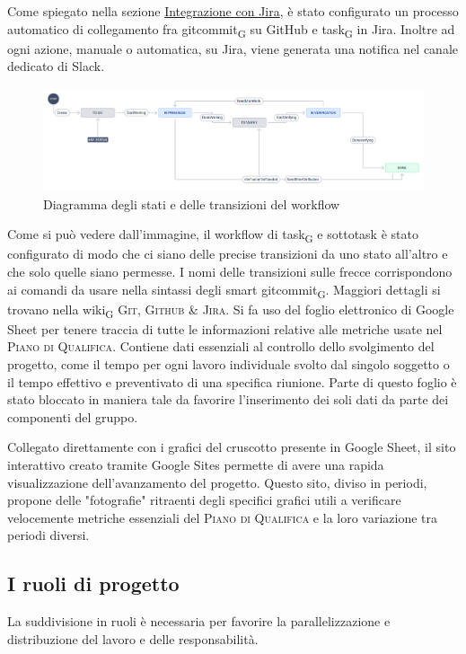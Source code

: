         Come spiegato nella sezione \hyperref[jiraintegration]{Integrazione con Jira}, è stato configurato un processo automatico di collegamento fra gitcommit\textsubscript{G} su GitHub e task\textsubscript{G} in Jira. Inoltre ad ogni azione, manuale o automatica, su Jira, viene generata una notifica nel canale dedicato di Slack.
        \begin{figure}[H]
            \centering
            \includegraphics[scale=0.32]{res/images/jira_workflow.png}
            \caption{Diagramma degli stati e delle transizioni del workflow}
        \end{figure}
            Come si può vedere dall'immagine, il workflow di task\textsubscript{G} e sottotask è stato configurato di modo che ci siano delle precise transizioni da uno stato all'altro e che solo quelle siano permesse. I nomi delle transizioni sulle frecce corrispondono ai comandi da usare nella sintassi degli smart gitcommit\textsubscript{G}. Maggiori dettagli si trovano nella wiki\textsubscript{G} \textsc{Git, Github \& Jira}.
        Si fa uso del foglio elettronico di Google Sheet per tenere traccia di tutte le informazioni relative alle metriche usate nel \textsc{Piano di Qualifica}. Contiene dati essenziali al controllo dello svolgimento del progetto, come il tempo per ogni lavoro individuale svolto dal singolo soggetto o il tempo effettivo e preventivato di una specifica riunione. Parte di questo foglio è stato bloccato in maniera tale da favorire l'inserimento dei soli dati da parte dei componenti del gruppo.
        
        Collegato direttamente con i grafici del cruscotto presente in Google Sheet, il sito interattivo creato tramite Google Sites permette di avere una rapida visualizzazione dell'avanzamento del progetto. Questo sito, diviso in periodi, propone delle "fotografie" ritraenti degli specifici grafici utili a verificare velocemente metriche essenziali del \textsc{Piano di Qualifica} e la loro variazione tra periodi diversi.

\subsection{I ruoli di progetto}
    La suddivisione in ruoli è necessaria per favorire la parallelizzazione e distribuzione del lavoro e delle responsabilità.
